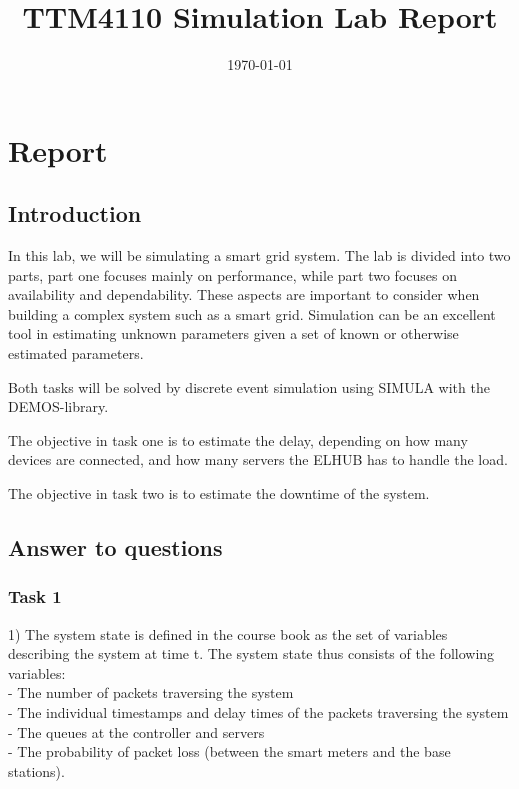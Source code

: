 \documentclass[11pt]{article}
\title{TTM4110 Simulation Lab Report}
\date{{\today}}
\begin{document}
\pagestyle{plain}

\maketitle

\section{Report}

\subsection{Introduction}

In this lab, we will be simulating a smart grid system. The lab is divided into two parts, part one focuses mainly on performance, while part two focuses on availability and dependability. These aspects are important to consider when building a complex system such as a smart grid. Simulation can be an excellent tool in estimating unknown parameters given a set of known or otherwise estimated parameters.

Both tasks will be solved by discrete event simulation using SIMULA with the DEMOS-library.

The objective in task one is to estimate the delay, depending on how many devices are connected, and how many servers the ELHUB has to handle the load.

The objective in task two is to estimate the downtime of the system.


\newpage
\subsection{Answer to questions}

\subsubsection{Task 1}

1) The system state is defined in the course book as the set of variables describing the system at time t. The system state thus consists of the following variables:\\
- The number of packets traversing the system\\
- The individual timestamps and delay times of the packets traversing the system\\
- The queues at the controller and servers\\
- The probability of packet loss (between the smart meters and the base stations).\\
\end{document}
